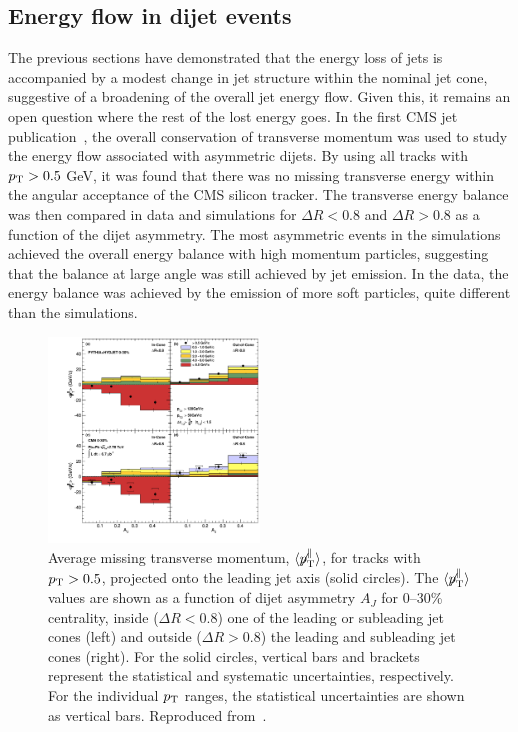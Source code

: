 \subsection{Energy flow in dijet events}

The previous sections have demonstrated that the energy loss of jets is accompanied by a modest
change in jet structure within the nominal jet cone, suggestive of a broadening of the overall
jet energy flow.
Given this, it remains an open question where the rest of the lost energy goes.  
In the first CMS jet publication~\cite{Chatrchyan:2011sx}, 
the overall conservation of transverse momentum was used to 
study the energy flow associated with asymmetric dijets.  By using all tracks with $\mbox{$p_{\mathrm{T}}$}>0.5$ GeV,
it was found that there was no missing transverse energy within the angular acceptance of the
CMS silicon tracker.  
The transverse energy balance was then compared in data and simulations 
for $\Delta R<0.8$ and $\Delta R >0.8$ as a function of the dijet asymmetry.
The most asymmetric events in the simulations achieved the overall energy balance 
with high momentum particles, suggesting that the balance at large angle was still achieved
by jet emission.  In the data, the energy balance was achieved by the emission of more 
soft particles, quite different than the simulations.

\begin{figure}[!ht]
\begin{center}
\includegraphics[width=0.5\textwidth]{jetfigures/missingPtParallel-Corrected-data-InConeOutConeDPhiCut_ntv6_2.pdf}
\caption{Average missing transverse momentum,
$\langle \displaystyle{\not} p_{\mathrm{T}}^{\parallel} \rangle$,
for tracks with $\mbox{$p_{\mathrm{T}}$} > 0.5$\GeVc, projected onto the leading jet axis (solid circles).
The $\langle \displaystyle{\not} p_{\mathrm{T}}^{\parallel} \rangle$ values are
shown as a function of dijet asymmetry
$A_J$ for 0--30\% centrality, inside ($\Delta R < 0.8$) one of the leading or subleading jet cones (left) and
outside ($\Delta R > 0.8$) the leading and subleading jet cones (right).
For the solid circles, vertical bars and brackets represent
the statistical and systematic uncertainties, respectively.
For the individual $\mbox{$p_{\mathrm{T}}$}$ ranges, the statistical uncertainties are shown as vertical bars.
Reproduced from~\cite{Chatrchyan:2011sx}.}
\label{fig:GR:CMS_missingpT}
\end{center}
\end{figure}

